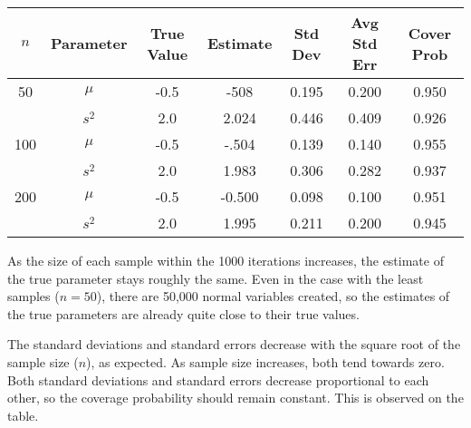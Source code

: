 \documentclass{article}
\begin{document}
\begin{center}
\begin{tabular}{ c c c c c c c }
\hline
$n$&Parameter&True Value&Estimate&Std Dev&Avg Std Err&Cover Prob \\
\hline
50&$\mu$&-0.5&-508&0.195&0.200&0.950\\
&$s^2$&2.0&2.024&0.446&0.409&0.926\\
100&$\mu$&-0.5&-.504&0.139&0.140&0.955\\
&$s^2$&2.0&1.983&0.306&0.282&0.937\\
200&$\mu$&-0.5&-0.500&0.098&0.100&0.951\\
&$s^2$&2.0&1.995&0.211&0.200&0.945\\
\end{tabular}
\end{center}

As the size of each sample within the 1000 iterations increases, the estimate of the true parameter stays roughly the same. Even in the case with the least samples ($n=50$), there are 50,000 normal variables created, so the estimates of the true parameters are already quite close to their true values.

The standard deviations and standard errors decrease with the square root of the sample size ($n$), as expected. As sample size increases, both tend towards zero. Both standard deviations and standard errors decrease proportional to each other, so the coverage probability should remain constant. This is observed on the table. 
\end{document}
